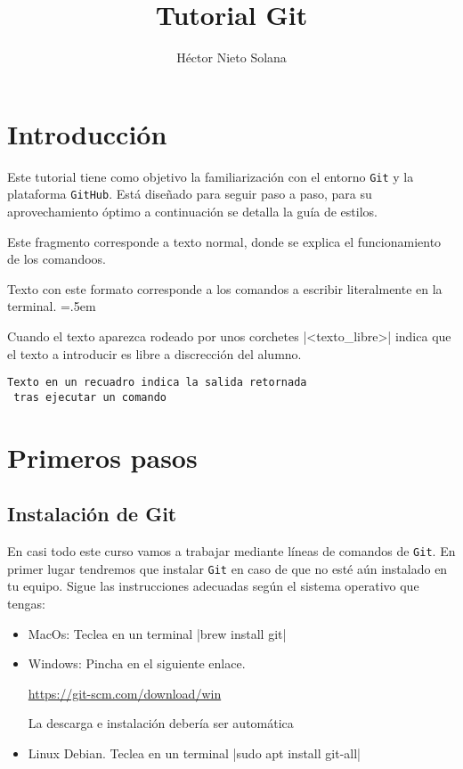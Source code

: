 \documentclass[a4paper,10pt]{report}
\title{Tutorial Git}
\author{Héctor Nieto Solana}
\newenvironment{cverbatim}
 {\SaveVerbatim{cverb}}
 {\endSaveVerbatim
  \flushleft\fboxrule=0pt\fboxsep=.5em
  \colorbox{bg}{\BUseVerbatim{cverb}}%
  \endflushleft
}
\begin{document}
 \maketitle
 \chapter{Introducción}
 Este tutorial tiene como objetivo la familiarización con el entorno \verb+Git+ y la plataforma \verb+GitHub+. Está diseñado para seguir paso a paso, para su aprovechamiento óptimo a continuación se detalla la guía de estilos.
 
 Este fragmento corresponde a texto normal, donde se explica el funcionamiento de los comandoos.
 
 \begin{cverbatim}
  Texto con este formato corresponde a los comandos a escribir
  literalmente en la terminal. 
 \end{cverbatim}

  Cuando el texto aparezca rodeado por unos corchetes \cverb|<texto_libre>| indica que el texto a introducir es libre a discrección del alumno.
  
 \begin{lstlisting}[frame=single, caption=Ejemplo de salida retornada por un comando]
 Texto en un recuadro indica la salida retornada 
 tras ejecutar un comando
 \end{lstlisting} 

 
 \chapter{Primeros pasos}
  \section{Instalación de Git}
    En casi todo este curso vamos a trabajar mediante líneas de comandos de \verb+Git+. En primer lugar tendremos que instalar \verb+Git+ en caso de que no esté aún instalado en tu equipo. Sigue las instrucciones adecuadas según el sistema operativo que tengas: 
    
      \begin{itemize}
      \item MacOs: Teclea en un terminal
        \cverb|brew install git|

      \item Windows: Pincha en el siguiente enlace. 
      
      \url{https://git-scm.com/download/win}
      
      La descarga e instalación debería ser automática
        
      \item Linux Debian. Teclea en un terminal
        \cverb|sudo apt install git-all|
      \end{itemize}
      
\end{document}
